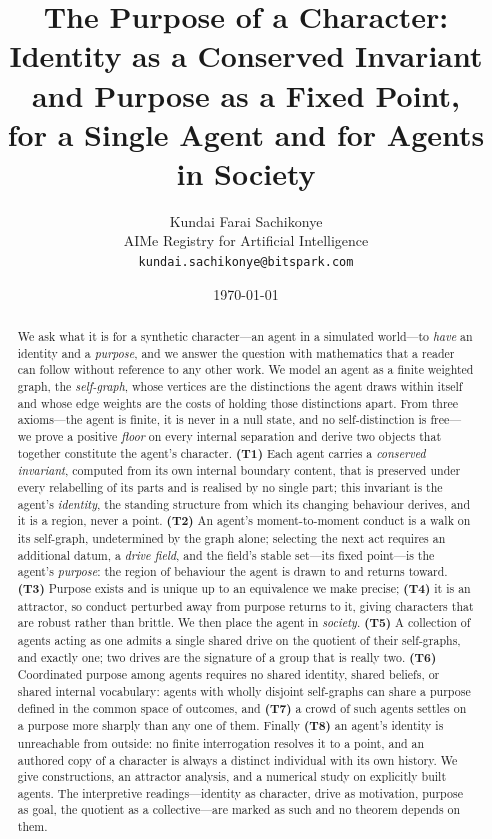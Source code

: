 \documentclass[11pt,twocolumn,a4paper]{article}
\title{\textbf{The Purpose of a Character:\\
Identity as a Conserved Invariant and Purpose as a Fixed Point,\\
for a Single Agent and for Agents in Society}}
\author{Kundai Farai Sachikonye\\[2pt]
\small AIMe Registry for Artificial Intelligence\\
\small \texttt{kundai.sachikonye@bitspark.com}}
\date{\today}
\begin{document}
\maketitle

\begin{abstract}
\noindent
We ask what it is for a synthetic character---an agent in a simulated
world---to \emph{have} an identity and a \emph{purpose}, and we answer
the question with mathematics that a reader can follow without reference
to any other work. We model an agent as a finite weighted graph, the
\emph{self-graph}, whose vertices are the distinctions the agent draws
within itself and whose edge weights are the costs of holding those
distinctions apart. From three axioms---the agent is finite, it is never
in a null state, and no self-distinction is free---we prove a positive
\emph{floor} on every internal separation and derive two objects that
together constitute the agent's character. \textbf{(T1)} Each agent
carries a \emph{conserved invariant}, computed from its own internal
boundary content, that is preserved under every relabelling of its parts
and is realised by no single part; this invariant is the agent's
\emph{identity}, the standing structure from which its changing behaviour
derives, and it is a region, never a point. \textbf{(T2)} An agent's
moment-to-moment conduct is a walk on its self-graph, undetermined by the
graph alone; selecting the next act requires an additional datum, a
\emph{drive field}, and the field's stable set---its fixed point---is the
agent's \emph{purpose}: the region of behaviour the agent is drawn to and
returns toward. \textbf{(T3)} Purpose exists and is unique up to an
equivalence we make precise; \textbf{(T4)} it is an attractor, so conduct
perturbed away from purpose returns to it, giving characters that are
robust rather than brittle. We then place the agent in \emph{society}.
\textbf{(T5)} A collection of agents acting as one admits a single shared
drive on the quotient of their self-graphs, and exactly one; two drives
are the signature of a group that is really two. \textbf{(T6)} Coordinated
purpose among agents requires no shared identity, shared beliefs, or
shared internal vocabulary: agents with wholly disjoint self-graphs can
share a purpose defined in the common space of outcomes, and \textbf{(T7)}
a crowd of such agents settles on a purpose more sharply than any one of
them. Finally \textbf{(T8)} an agent's identity is unreachable from
outside: no finite interrogation resolves it to a point, and an authored
copy of a character is always a distinct individual with its own history.
We give constructions, an attractor analysis, and a numerical study on
explicitly built agents. The interpretive readings---identity as
character, drive as motivation, purpose as goal, the quotient as a
collective---are marked as such and no theorem depends on them.
\end{abstract}
\end{document}

